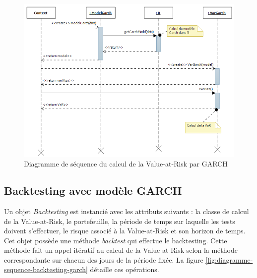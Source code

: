 \documentclass[a4paper,titlepage,french]{report}
\begin{document}
\begin{figure}
  	\center
  	\includegraphics[width=1\textwidth]{diagSeqGarch.png}
  	\caption{Diagramme de séquence du calcul de la Value-at-Risk par GARCH}
    \label{fig:diagramme-sequence-var-garch}
\end{figure}


\subsection{Backtesting avec modèle GARCH}
\label{backtesting-modele-garch}

Un objet \textit{Backtesting} est instancié avec les attributs suivants : la classe de calcul de la Value-at-Risk, le portefeuille, la période de temps sur laquelle les tests doivent s'effectuer, le risque associé à la Value-at-Risk et son horizon de temps.
Cet objet possède une méthode \textit{backtest} qui effectue le backtesting.
Cette méthode fait un appel itératif au calcul de la Value-at-Risk selon la méthode correspondante sur chacun des jours de la période fixée.
La figure \ref{fig:diagramme-sequence-backtesting-garch} détaille ces opérations.
\end{document}

